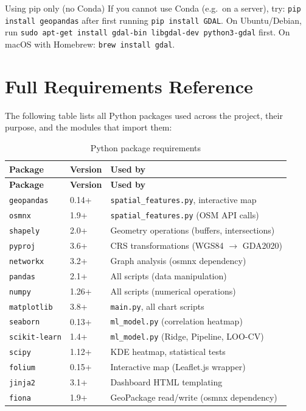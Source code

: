 \documentclass[11pt,a4paper,openany]{book}
\begin{document}
\begin{tipbox}{Using pip only (no Conda)}
If you cannot use Conda (e.g.\ on a server), try: \texttt{pip install geopandas} after first running \texttt{pip install GDAL}. On Ubuntu/Debian, run \texttt{sudo apt-get install gdal-bin libgdal-dev python3-gdal} first. On macOS with Homebrew: \texttt{brew install gdal}.
\end{tipbox}

\section{Full Requirements Reference}

The following table lists all Python packages used across the project, their purpose, and the modules that import them:

\begin{longtable}{L{3.5cm}L{2cm}L{7cm}}
\caption{Python package requirements}\label{tab:requirements}\\
\toprule
\textbf{Package} & \textbf{Version} & \textbf{Used by} \\
\midrule
\endfirsthead
\toprule
\textbf{Package} & \textbf{Version} & \textbf{Used by} \\
\midrule
\endhead
\bottomrule
\endfoot
\texttt{geopandas} & 0.14+ & \texttt{spatial\_features.py}, interactive map \\
\texttt{osmnx} & 1.9+ & \texttt{spatial\_features.py} (OSM API calls) \\
\texttt{shapely} & 2.0+ & Geometry operations (buffers, intersections) \\
\texttt{pyproj} & 3.6+ & CRS transformations (WGS84 $\to$ GDA2020) \\
\texttt{networkx} & 3.2+ & Graph analysis (osmnx dependency) \\
\texttt{pandas} & 2.1+ & All scripts (data manipulation) \\
\texttt{numpy} & 1.26+ & All scripts (numerical operations) \\
\texttt{matplotlib} & 3.8+ & \texttt{main.py}, all chart scripts \\
\texttt{seaborn} & 0.13+ & \texttt{ml\_model.py} (correlation heatmap) \\
\texttt{scikit-learn} & 1.4+ & \texttt{ml\_model.py} (Ridge, Pipeline, LOO-CV) \\
\texttt{scipy} & 1.12+ & KDE heatmap, statistical tests \\
\texttt{folium} & 0.15+ & Interactive map (Leaflet.js wrapper) \\
\texttt{jinja2} & 3.1+ & Dashboard HTML templating \\
\texttt{fiona} & 1.9+ & GeoPackage read/write (osmnx dependency) \\
\end{longtable}
\end{document}
